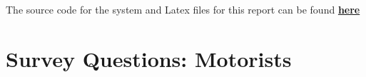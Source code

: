 \clearpage


\begin{appendices}
    The source code for the system and Latex files for this report can be found \href{https://github.com/Mnoble-19/final-year-project}\textbf{{here}}
    \section*{Survey Questions: Motorists}
    \begin{figure}[h]%
        \hspace{-2cm}
        \centering

\end{figure}
\end{appendices}
